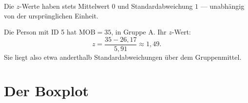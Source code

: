 \begin{merksatz}
Die $z$-Werte haben stets Mittelwert $0$ und Standardabweichung $1$ --- unabhängig von der ursprünglichen Einheit.

Die Person mit ID 5 hat $\mathrm{MOB} = 35$, in Gruppe A. Ihr $z$-Wert:
\[ z = \frac{35 - 26{,}17}{5{,}91} \approx 1{,}49 . \]
Sie liegt also etwa anderthalb Standardabweichungen über dem Gruppenmittel.

\begin{center}
\begin{minipage}{0.88\textwidth}
\end{minipage}
\end{center}
\end{merksatz}

\section{Der Boxplot}

